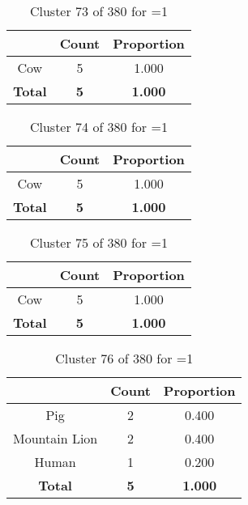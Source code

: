\begin{table}[ht!]
\centering
\begin{tabular}{|c|c|c|}
\hline
\bf \Spec{} &\bf Count &\bf Proportion\\ \hline \hline
Cow & 5 & 1.000\\ \hline
\hline
\bf Total & \bf 5 & \bf 1.000\\ \hline
\end{tabular}
\label{tab:cluster:73:1}
\caption{Cluster 73 of 380 for \minneigh{}=1}
\end{table}

\begin{table}[ht!]
\centering
\begin{tabular}{|c|c|c|}
\hline
\bf \Spec{} &\bf Count &\bf Proportion\\ \hline \hline
Cow & 5 & 1.000\\ \hline
\hline
\bf Total & \bf 5 & \bf 1.000\\ \hline
\end{tabular}
\label{tab:cluster:74:1}
\caption{Cluster 74 of 380 for \minneigh{}=1}
\end{table}

\begin{table}[ht!]
\centering
\begin{tabular}{|c|c|c|}
\hline
\bf \Spec{} &\bf Count &\bf Proportion\\ \hline \hline
Cow & 5 & 1.000\\ \hline
\hline
\bf Total & \bf 5 & \bf 1.000\\ \hline
\end{tabular}
\label{tab:cluster:75:1}
\caption{Cluster 75 of 380 for \minneigh{}=1}
\end{table}

\begin{table}[ht!]
\centering
\begin{tabular}{|c|c|c|}
\hline
\bf \Spec{} &\bf Count &\bf Proportion\\ \hline \hline
Pig & 2 & 0.400\\ \hline
Mountain Lion & 2 & 0.400\\ \hline
Human & 1 & 0.200\\ \hline
\hline
\bf Total & \bf 5 & \bf 1.000\\ \hline
\end{tabular}
\label{tab:cluster:76:1}
\caption{Cluster 76 of 380 for \minneigh{}=1}
\end{table}

